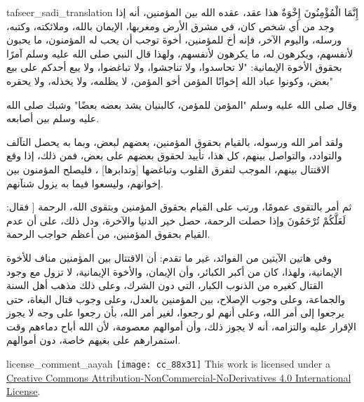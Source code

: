 \begin{taggedblock}{tafseer_sadi_translation}
{ إِنَّمَا الْمُؤْمِنُونَ إِخْوَةٌ }
هذا عقد، عقده الله بين المؤمنين، أنه إذا وجد من أي شخص كان، في مشرق الأرض ومغربها، الإيمان بالله، وملائكته، وكتبه، ورسله، واليوم الآخر، فإنه أخ للمؤمنين، أخوة توجب أن يحب له المؤمنون، ما يحبون لأنفسهم، ويكرهون له، ما يكرهون لأنفسهم، ولهذا قال النبي صلى الله عليه وسلم آمرًا بحقوق الأخوة الإيمانية:
"لا تحاسدوا، ولا تناجشوا، ولا تباغضوا، ولا يبع أحدكم على بيع بعض، وكونوا عباد الله إخوانًا المؤمن أخو المؤمن، لا يظلمه، ولا يخذله، ولا يحقره"

وقال صلى الله عليه وسلم
"المؤمن للمؤمن، كالبنيان يشد بعضه بعضًا"
وشبك صلى الله عليه وسلم بين أصابعه.

ولقد أمر الله ورسوله، بالقيام بحقوق المؤمنين، بعضهم لبعض، وبما به يحصل التآلف والتوادد، والتواصل بينهم، كل هذا، تأييد لحقوق بعضهم على بعض، فمن ذلك، إذا وقع الاقتتال بينهم، الموجب لتفرق القلوب وتباغضها
[وتدابرها]
، فليصلح المؤمنون بين إخوانهم، وليسعوا فيما به يزول شنآنهم.

ثم أمر بالتقوى عمومًا، ورتب على القيام بحقوق المؤمنين وبتقوى الله، الرحمة [ فقال:
{ لَعَلَّكُمْ تُرْحَمُونَ }
وإذا حصلت الرحمة، حصل خير الدنيا والآخرة، ودل ذلك، على أن عدم القيام بحقوق المؤمنين، من أعظم حواجب الرحمة.

وفي هاتين الآيتين من الفوائد، غير ما تقدم: أن الاقتتال بين المؤمنين مناف للأخوة الإيمانية، ولهذا، كان من أكبر الكبائر، وأن الإيمان، والأخوة الإيمانية، لا تزول مع وجود القتال كغيره من الذنوب الكبار، التي دون الشرك، وعلى ذلك مذهب أهل السنة والجماعة، وعلى وجوب الإصلاح، بين المؤمنين بالعدل، وعلى وجوب قتال البغاة، حتى يرجعوا إلى أمر الله، وعلى أنهم لو رجعوا، لغير أمر الله، بأن رجعوا على وجه لا يجوز الإقرار عليه والتزامه، أنه لا يجوز ذلك، وأن أموالهم معصومة، لأن الله أباح دماءهم وقت استمرارهم على بغيهم خاصة، دون أموالهم.
\end{taggedblock}
\begin{taggedblock}{license_comment_aayah}
\texttt{[image: cc\_88x31]}
This work is licensed under a 
\href{http://creativecommons.org/licenses/by-nc-nd/4.0/}{Creative Commons Attribution-NonCommercial-NoDerivatives 4.0 International License}.
\end{taggedblock}
\begin{comment}
Please use the following for footnotes:- Sample\footnoteQ{Text of Qur'an footnote goes here.}.
Sample\footnoteT{Text of Tafseer footnote goes here.}.
\end{comment}